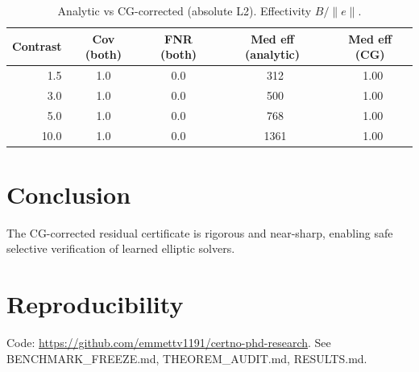 \documentclass[conference]{IEEEtran}
\begin{document}
\begin{table}[h]
\centering
\caption{Analytic vs CG-corrected (absolute L2). Effectivity $B/\|e\|$.}
\label{tab:comp}
\begin{tabular}{rcccc}
\toprule
Contrast & Cov (both) & FNR (both) & Med eff (analytic) & Med eff (CG)\\
\midrule
1.5 & 1.0 & 0.0 & ~312 & ~1.00\\
3.0 & 1.0 & 0.0 & ~500 & ~1.00\\
5.0 & 1.0 & 0.0 & ~768 & ~1.00\\
10.0 & 1.0 & 0.0 & ~1361 & ~1.00\\
\bottomrule
\end{tabular}
\end{table}

\section{Conclusion}
The CG-corrected residual certificate is rigorous and near-sharp, enabling safe selective verification of learned elliptic solvers.

\section*{Reproducibility}
Code: \url{https://github.com/emmettv1191/certno-phd-research}. See BENCHMARK\_FREEZE.md, THEOREM\_AUDIT.md, RESULTS.md.
\end{document}
